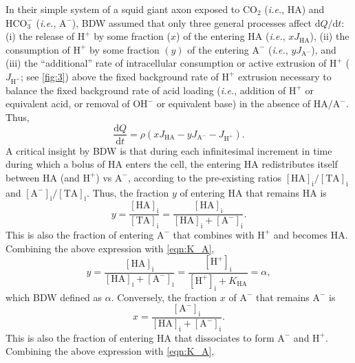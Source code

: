 \documentclass[fleqn,10pt]{physiome}
\begin{document}
In their simple system of a squid giant axon exposed to $\mathrm{CO_2}$ (\emph{i.e.}, $\mathrm{HA}$) and $\mathrm{HCO_3^-}$ (\emph{i.e.}, $\mathrm{A^-}$), BDW assumed that only three general processes affect $\mathrm{d}Q/\mathrm{d}t$: (i) the release of $\mathrm{H^+}$ by some fraction ($x$) of the entering $\mathrm{HA}$ (\emph{i.e.}, $xJ_\mathrm{HA}$), (ii) the consumption of $\mathrm{H^+}$ by some fraction $(y)$ of the entering $\mathrm{A^-}$ (\emph{i.e.}, $yJ_\mathrm{A^-}$), and (iii) the ``additional'' rate of intracellular consumption or active extrusion of $\mathrm{H^+}$ ($J_\mathrm{H^+}$; see \autoref{fig:3}) above the fixed background rate of $\mathrm{H^+}$ extrusion necessary to balance the fixed background rate of acid loading (\emph{i.e.}, addition of $\mathrm{H^+}$ or equivalent acid, or removal of $\mathrm{OH^-}$ or equivalent base) in the absence of $\mathrm{HA}/\mathrm{A^-}$. Thus,
\begin{equation}
\dfrac{\mathrm{d}Q}{\mathrm{d}t}=\rho\left(xJ_\mathrm{HA}-yJ_\mathrm{A^-}-J_\mathrm{H^+}\right).
\label{eqn:rate_Q}
\end{equation}
A critical insight by BDW is that during each infinitesimal increment in time during which a bolus of $\mathrm{HA}$ enters the cell, the entering $\mathrm{HA}$ redistributes itself between $\mathrm{HA}$ (and $\mathrm{H^+}$) vs $\mathrm{A^-}$, according to the pre-existing ratios $\mathrm{[HA]_i}/\mathrm{[TA]_i}$ and $\mathrm{[A^-]_i}/\mathrm{[TA]_i}$. Thus, the fraction $y$ of entering $\mathrm{HA}$ that remains $\mathrm{HA}$ is
\begin{equation}
y=\dfrac{\mathrm{[HA]_i}}{\mathrm{[TA]_i}}=\dfrac{\mathrm{[HA]_i}}{\mathrm{[HA]_i}+\mathrm{[A^-]_i}}.
\end{equation}
This is also the fraction of entering $\mathrm{A^-}$ that combines with $\mathrm{H^+}$ and becomes $\mathrm{HA}$. Combining the above expression with \autoref{eqn:K_A},
\begin{equation}
y=\dfrac{\mathrm{[HA]_i}}{\mathrm{[HA]_i}+\mathrm{[A^-]_i}}=\dfrac{\mathrm{[H^+]_i}}{\mathrm{[H^+]_i}+K_\mathrm{HA}}=\alpha,
\label{eqn:y}
\end{equation}
which BDW defined as $\alpha$. Conversely, the fraction $x$ of $\mathrm{A^-}$ that remains $\mathrm{A^-}$ is
\begin{equation}
x=\dfrac{\mathrm{[A^-]_i}}{\mathrm{[HA]_i}+\mathrm{[A^-]_i}}.
\end{equation}
This is also the fraction of entering $\mathrm{HA}$ that dissociates to form $\mathrm{A^-}$ and $\mathrm{H^+}$. Combining the above expression with \autoref{eqn:K_A},
\end{document}
